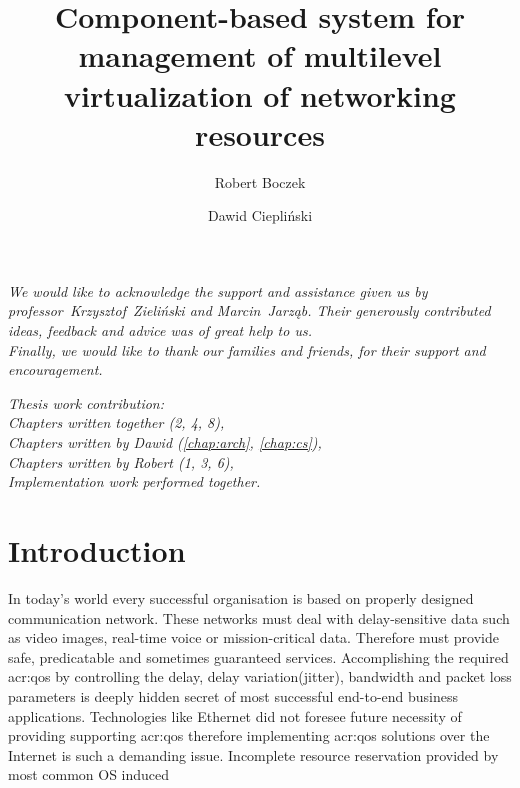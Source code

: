 \documentclass[11pt]{book}
\title{Component-based system for management of multilevel virtualization of networking resources}
\author{Robert Boczek \and Dawid Ciepliński}
\begin{document}
  \maketitle

  \tableofcontents

  \listoffigures

  \printglossaries

  \newpage
	\vspace*{2in}

	\begin{center}
    \textit{We would like to acknowledge the support and assistance given us by professor~Krzysztof~Zieliński and
            Marcin~Jarząb. Their generously contributed ideas, feedback and advice was of great help to us. \\
            Finally, we would like to thank our families and friends, for their support and encouragement.}
  \end{center}

  \newpage
	\vspace*{2in}

	\begin{center}
    \textit{Thesis work contribution: \\
            Chapters written together (2, 4, 8), \\
            Chapters written by Dawid (\ref{chap:arch}, \ref{chap:cs}), \\
            Chapters written by Robert (1, 3, 6), \\
            Implementation work performed together.}
  \end{center}

  \chapter{Introduction}

	
  In today's world every successful organisation is based on properly designed communication network. These networks
  must deal with delay-sensitive data such as video images, real-time voice or mission-critical data. Therefore must
  provide safe, predicatable and sometimes guaranteed services. Accomplishing the required \gls{acr:qos} by controlling
  the delay, delay variation(jitter), bandwidth and packet loss parameters is deeply hidden secret of most successful
  end-to-end business applications. Technologies like Ethernet did not foresee future necessity of providing supporting
  \gls{acr:qos} therefore implementing \gls{acr:qos} solutions over the Internet is such a demanding issue. Incomplete 
 resource reservation provided by most common OS induced 
\end{document}
